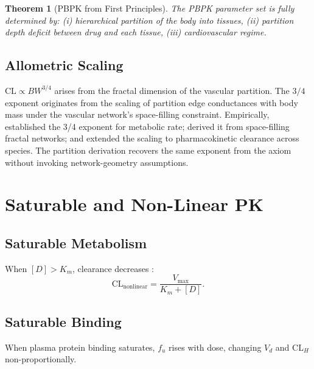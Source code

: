 \documentclass[twocolumn,10pt,a4paper]{article}
\newtheorem{theorem}{Theorem}[section]
\theoremstyle{definition}
\theoremstyle{remark}
\begin{document}
\begin{theorem}[PBPK from First Principles]
The PBPK parameter set is fully determined by: (i) hierarchical partition of the body into tissues, (ii) partition depth deficit between drug and each tissue, (iii) cardiovascular regime.
\end{theorem}

\subsection{Allometric Scaling}

$\mathrm{CL}\propto BW^{3/4}$ arises from the fractal dimension of the vascular partition. The $3/4$ exponent originates from the scaling of partition edge conductances with body mass under the vascular network's space-filling constraint. Empirically, \citet{kleiber_1932} established the 3/4 exponent for metabolic rate; \citet{west_brown_enquist_1997} derived it from space-filling fractal networks; \citet{boxenbaum_1982} and \citet{mahmood_balian_1996} extended the scaling to pharmacokinetic clearance across species. The partition derivation recovers the same exponent from the axiom without invoking network-geometry assumptions.

\section{Saturable and Non-Linear PK}

\subsection{Saturable Metabolism}

When $[D]>K_m$, clearance decreases \citep{michaelis_menten_1913,briggs_haldane_1925,eyring_1935}:
\begin{equation}
    \mathrm{CL}_{\mathrm{nonlinear}} = \frac{V_{\max}}{K_m + [D]}.
\end{equation}

\subsection{Saturable Binding}

When plasma protein binding saturates, $f_u$ rises with dose, changing $V_d$ and $\mathrm{CL}_H$ non-proportionally.
\end{document}
